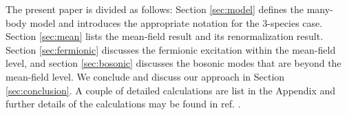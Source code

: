 \documentclass[reprint,pra]{revtex4-1}
\begin{document}
The present paper is divided as follows:
Section \ref{sec:model}  defines the many-body model and introduces the appropriate notation for the 3-species case. Section \ref{sec:mean} lists the mean-field result and its renormalization result. Section \ref{sec:fermionic} discusses the fermionic excitation within the mean-field level, and  section \ref{sec:bosonic} discusses the bosonic modes that are  beyond the mean-field level. We conclude and discuss our approach in Section \ref{sec:conclusion}.  A couple of detailed calculations are list in the Appendix and further details of the calculations may be found in ref. \cite{Zhuthesis}. 
\end{document}
